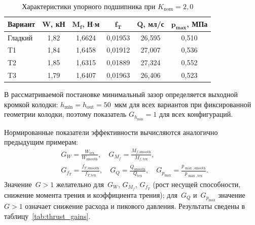\begin{table}[!ht]
\centering
\caption{Характеристики упорного подшипника при $K_{\mathrm{nom}} = 2{,}0$}
\label{tab:thrust_results}
\begin{tabularx}{\textwidth}{|X|c|c|c|c|c|}
\hline
\multicolumn{1}{|c|}{\textbf{Вариант}}
  & $\boldsymbol{W}$, \textbf{кН}
  & $\boldsymbol{M_f}$, \textbf{Н$\cdot$м}
  & $\boldsymbol{f_T}$
  & $\boldsymbol{Q}$, \textbf{мл/с}
  & $\boldsymbol{p_{\max}}$, \textbf{МПа} \\
\hline
Гладкий & 1{,}82 & 1{,}6624 & 0{,}01953 & 26{,}595 & 0{,}510 \\
\hline
T1      & 1{,}84 & 1{,}6458 & 0{,}01912 & 27{,}007 & 0{,}536 \\
\hline
T2      & 1{,}85 & 1{,}6315 & 0{,}01889 & 27{,}324 & 0{,}552 \\
\hline
T3      & 1{,}79 & 1{,}6407 & 0{,}01963 & 26{,}406 & 0{,}523 \\
\hline
\end{tabularx}
\end{table}

\FloatBarrier

В рассматриваемой постановке минимальный зазор определяется
выходной кромкой колодки:
$h_{\min} = h_{\mathrm{out}} = 50$~мкм для всех вариантов
при фиксированной геометрии колодки, поэтому показатель
$G_{h_{\min}} = 1$ для всех конфигураций.

Нормированные показатели эффективности вычисляются аналогично
предыдущим примерам:
\begin{equation}
\begin{split}
  &G_W = \frac{W_{\mathrm{tex}}}{W_{\mathrm{smooth}}}, \quad
  G_{M_f} = \frac{M_{f,\mathrm{smooth}}}{M_{f,\mathrm{tex}}}, \\
  &G_{f_T} = \frac{f_{T,\mathrm{smooth}}}{f_{T,\mathrm{tex}}}, \quad
  G_Q = \frac{Q_{\mathrm{smooth}}}{Q_{\mathrm{tex}}}, \quad
  G_{p_{\max}} = \frac{p_{\max,\mathrm{smooth}}}{p_{\max,\mathrm{tex}}}.
\end{split}
  \label{eq:thrust_gains}
\end{equation}
Значение~$G > 1$ желательно для~$G_W$, $G_{M_f}$, $G_{f_T}$
(рост несущей способности, снижение момента трения и коэффициента
трения); для~$G_Q$ и~$G_{p_{\max}}$ значение~$G > 1$ означает
снижение расхода и пикового давления. Результаты сведены
в таблицу~\ref{tab:thrust_gains}.

